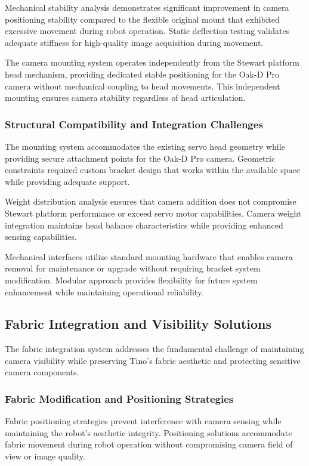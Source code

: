 Mechanical stability analysis demonstrates significant improvement in camera positioning stability compared to the flexible original mount that exhibited excessive movement during robot operation. Static deflection testing validates adequate stiffness for high-quality image acquisition during movement.

The camera mounting system operates independently from the Stewart platform head mechanism, providing dedicated stable positioning for the Oak-D Pro camera without mechanical coupling to head movements. This independent mounting ensures camera stability regardless of head articulation.

\subsubsection{Structural Compatibility and Integration Challenges}

The mounting system accommodates the existing servo head geometry while providing secure attachment points for the Oak-D Pro camera. Geometric constraints required custom bracket design that works within the available space while providing adequate support.

Weight distribution analysis ensures that camera addition does not compromise Stewart platform performance or exceed servo motor capabilities. Camera weight integration maintains head balance characteristics while providing enhanced sensing capabilities.

Mechanical interfaces utilize standard mounting hardware that enables camera removal for maintenance or upgrade without requiring bracket system modification. Modular approach provides flexibility for future system enhancement while maintaining operational reliability.

\subsection{Fabric Integration and Visibility Solutions}

The fabric integration system addresses the fundamental challenge of maintaining camera visibility while preserving Tino's fabric aesthetic and protecting sensitive camera components.

\subsubsection{Fabric Modification and Positioning Strategies}

Fabric positioning strategies prevent interference with camera sensing while maintaining the robot's aesthetic integrity. Positioning solutions accommodate fabric movement during robot operation without compromising camera field of view or image quality.

